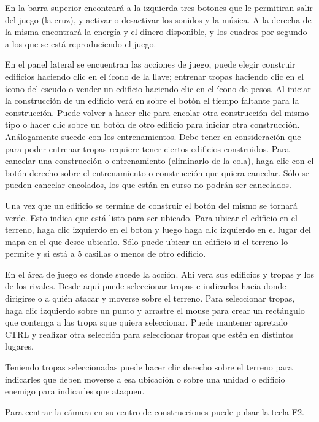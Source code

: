 \documentclass[titlepage,a4paper,12pt]{article}
\begin{document}
En la barra superior encontrará a la izquierda tres botones que le permitiran salir del juego (la cruz), y activar o desactivar los sonidos y la música. A la derecha de la misma encontrará la energía y el dinero disponible, y los cuadros por segundo a los que se está reproduciendo el juego.

En el panel lateral se encuentran las acciones de juego, puede elegir construir edificios haciendo clic en el ícono de la llave; entrenar tropas haciendo clic en el ícono del escudo o vender un edificio haciendo clic en el ícono de pesos. Al iniciar la construcción de un edificio verá en sobre el botón el tiempo faltante para la construcción. Puede volver a hacer clic para encolar otra construcción del mismo tipo o hacer clic sobre un botón de otro edificio para iniciar otra construcción. Análogamente sucede con los entrenamientos. Debe tener en consideración que para poder entrenar tropas requiere tener ciertos edificios construidos. Para cancelar una construcción o entrenamiento (eliminarlo de la cola), haga clic con el botón derecho sobre el entrenamiento o construcción que quiera cancelar. Sólo se pueden cancelar encolados, los que están en curso no podrán ser cancelados.

Una vez que un edificio se termine de construir el botón del mismo se tornará verde. Esto indica que está listo para ser ubicado. Para ubicar el edificio en el terreno, haga clic izquierdo en el boton y luego haga clic izquierdo en el lugar del mapa en el que desee ubicarlo. Sólo puede ubicar un edificio si el terreno lo permite y si está a 5 casillas o menos de otro edificio.

En el área de juego es donde sucede la acción. Ahí vera sus edificios y tropas y los de los rivales. Desde aquí puede seleccionar tropas e indicarles hacia donde dirigirse o a quién atacar y moverse sobre el terreno. Para seleccionar tropas, haga clic izquierdo sobre un punto y arrastre el mouse para crear un rectángulo que contenga a las tropa sque quiera seleccionar. Puede mantener apretado CTRL y realizar otra selección para seleccionar tropas que estén en distintos lugares. 

Teniendo tropas seleccionadas puede hacer clic derecho sobre el terreno para indicarles que deben moverse a esa ubicación o sobre una unidad o edificio enemigo para indicarles que ataquen.

Para centrar la cámara en su centro de construcciones puede pulsar la tecla F2.
\end{document}
